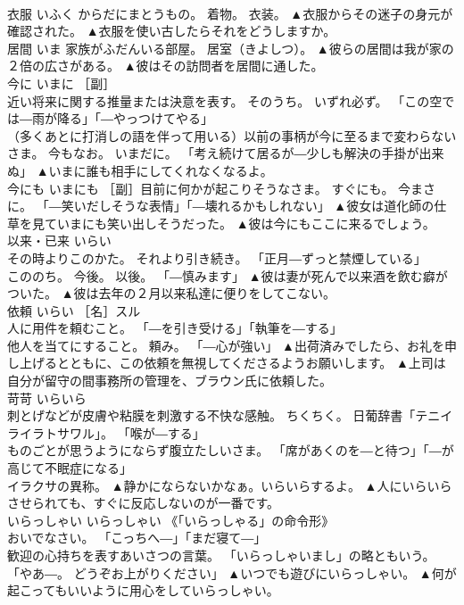 \documentclass[8pt]{extreport}
\begin{document}
\begin{CJK}{UTF8}{min}
\\	衣服	いふく	からだにまとうもの。 着物。 衣装。	▲衣服からその迷子の身元が確認された。 ▲衣服を使い古したらそれをどうしますか。
\\	居間	いま	家族がふだんいる部屋。 居室（きよしつ）。	▲彼らの居間は我が家の２倍の広さがある。 ▲彼はその訪問者を居間に通した。
\\	今に	いまに	［副］ 
\\	近い将来に関する推量または決意を表す。 そのうち。 いずれ必ず。 「この空では―雨が降る」「―やっつけてやる」 
\\	（多くあとに打消しの語を伴って用いる）以前の事柄が今に至るまで変わらないさま。 今もなお。 いまだに。 「考え続けて居るが―少しも解決の手掛が出来ぬ」	▲いまに誰も相手にしてくれなくなるよ。
\\	今にも	いまにも	［副］目前に何かが起こりそうなさま。 すぐにも。 今まさに。 「―笑いだしそうな表情」「―壊れるかもしれない」	▲彼女は道化師の仕草を見ていまにも笑い出しそうだった。 ▲彼は今にもここに来るでしょう。
\\	以来・已来	いらい	
\\	その時よりこのかた。 それより引き続き。 「正月―ずっと禁煙している」 
\\	こののち。 今後。 以後。 「―慎みます」	▲彼は妻が死んで以来酒を飲む癖がついた。 ▲彼は去年の２月以来私達に便りをしてこない。
\\	依頼	いらい	［名］スル 
\\	人に用件を頼むこと。 「―を引き受ける」「執筆を―する」 
\\	他人を当てにすること。 頼み。 「―心が強い」	▲出荷済みでしたら、お礼を申し上げるとともに、この依頼を無視してくださるようお願いします。 ▲上司は自分が留守の間事務所の管理を、ブラウン氏に依頼した。
\\	苛苛	いらいら	
\\	刺とげなどが皮膚や粘膜を刺激する不快な感触。 ちくちく。 日葡辞書「テニイライラトサワル」。 「喉が―する」 
\\	ものごとが思うようにならず腹立たしいさま。 「席があくのを―と待つ」「―が高じて不眠症になる」 
\\	イラクサの異称。	▲静かにならないかなぁ。いらいらするよ。 ▲人にいらいらさせられても、すぐに反応しないのが一番です。
\\	いらっしゃい	いらっしゃい	《「いらっしゃる」の命令形》 
\\	おいでなさい。 「こっちへ―」「まだ寝て―」 
\\	歓迎の心持ちを表すあいさつの言葉。 「いらっしゃいまし」の略ともいう。 「やあ―。 どうぞお上がりください」	▲いつでも遊びにいらっしゃい。 ▲何が起こってもいいように用心をしていらっしゃい。

\end{CJK}
\end{document}

